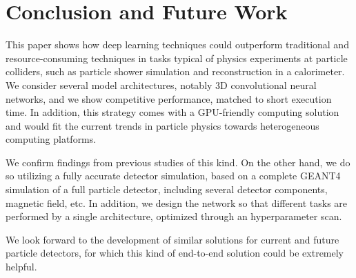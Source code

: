 \chapter{Conclusion and Future Work}\label{sec:conclusion}

This paper shows how deep learning techniques could outperform traditional and resource-consuming techniques in  tasks typical of physics experiments at particle colliders, such as particle shower simulation and reconstruction in a calorimeter.
We consider several model architectures, notably 3D convolutional neural networks, and we show competitive performance, matched to short execution time. In addition, this strategy comes with a GPU-friendly computing solution and would fit the current trends in particle physics towards heterogeneous computing platforms. 

We confirm findings from previous studies of this kind. On the other hand, we do so utilizing a fully accurate detector simulation, based on a complete GEANT4 simulation of a full particle detector, including several detector components, magnetic field, etc. In addition, we design the network so that different tasks are performed by a single architecture, optimized through an hyperparameter scan. 

We look forward to the development of similar solutions for current and future particle detectors, for which this kind of end-to-end solution could be extremely helpful. 